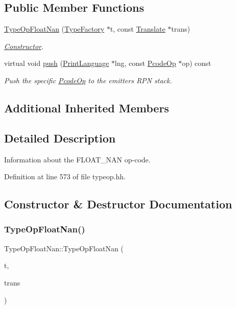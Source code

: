 \subsection*{Public Member Functions}
\begin{DoxyCompactItemize}
\item 
\mbox{\hyperlink{class_type_op_float_nan_acf7cd059e97161b35ffd7078489cba17}{Type\+Op\+Float\+Nan}} (\mbox{\hyperlink{class_type_factory}{Type\+Factory}} $\ast$t, const \mbox{\hyperlink{class_translate}{Translate}} $\ast$trans)
\begin{DoxyCompactList}\small\item\em \mbox{\hyperlink{class_constructor}{Constructor}}. \end{DoxyCompactList}\item 
virtual void \mbox{\hyperlink{class_type_op_float_nan_adf90c4fb0d1d2715c064ad1f963b534a}{push}} (\mbox{\hyperlink{class_print_language}{Print\+Language}} $\ast$lng, const \mbox{\hyperlink{class_pcode_op}{Pcode\+Op}} $\ast$op) const
\begin{DoxyCompactList}\small\item\em Push the specific \mbox{\hyperlink{class_pcode_op}{Pcode\+Op}} to the emitter\textquotesingle{}s R\+PN stack. \end{DoxyCompactList}\end{DoxyCompactItemize}
\subsection*{Additional Inherited Members}


\subsection{Detailed Description}
Information about the F\+L\+O\+A\+T\+\_\+\+N\+AN op-\/code. 

Definition at line 573 of file typeop.\+hh.



\subsection{Constructor \& Destructor Documentation}
\mbox{\label{class_type_op_float_nan_acf7cd059e97161b35ffd7078489cba17}} 
\subsubsection{\texorpdfstring{TypeOpFloatNan()}{TypeOpFloatNan()}}
{\footnotesize\ttfamily Type\+Op\+Float\+Nan\+::\+Type\+Op\+Float\+Nan (\begin{DoxyParamCaption}\item[{\mbox{\hyperlink{class_type_factory}{Type\+Factory}} $\ast$}]{t,  }\item[{const \mbox{\hyperlink{class_translate}{Translate}} $\ast$}]{trans }\end{DoxyParamCaption})}




